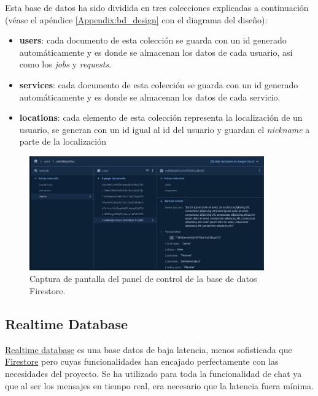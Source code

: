 Esta base de datos ha sido dividida en tres colecciones explicadas a continuación (véase el apéndice \ref{Appendix:bd_design} con el diagrama del diseño):
\begin{itemize}
    \item \textbf{users}: cada documento de esta colección se guarda con un id generado automáticamente y es donde se almacenan los datos de cada usuario, así como los \textit{jobs} y \textit{requests}.
    \item \textbf{services}: cada documento de esta colección se guarda con un id generado automáticamente y es donde se almacenan los datos de cada servicio.
    \item \textbf{locations}: cada elemento de esta colección representa la localización de un usuario, se generan con un id igual al id del usuario y guardan el \textit{nickname} a parte de la localización
\end{itemize}
\newpage
\begin{figure}[h]
    \centering
    \includegraphics[width = 0.9\textwidth]{Imagenes/Fuentes/ejemplo_firestore.png}
    \caption{Captura de pantalla del panel de control de la base de datos Firestore.}
    \label{fig:ejemplo_firestore}
\end{figure}
\hypertarget{subsec:realtime}{}
\subsection{Realtime Database}
\href{https://firebase.google.com/docs/database/}{Realtime database} es una base datos de baja latencia, menos sofisticada que \hyperlink{subsec:firestore}{Firestore} pero cuyas funcionalidades han encajado perfectamente con las necesidades del proyecto. Se ha utilizado para toda la funcionalidad de chat ya que al ser los mensajes en tiempo real, era necesario que la latencia fuera mínima. 

